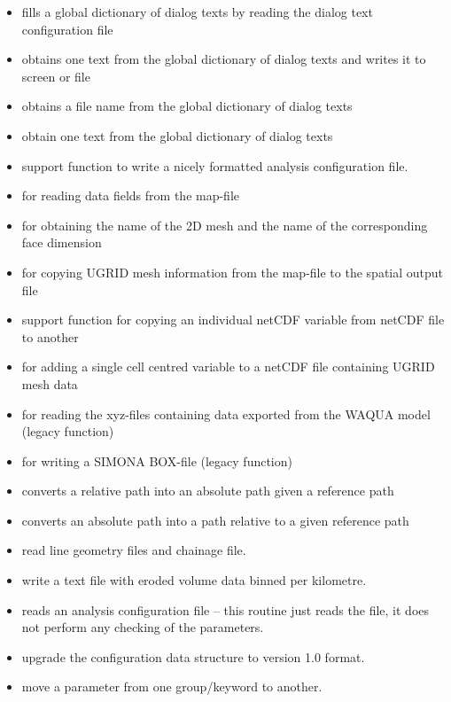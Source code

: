 \begin{itemize}
\item {} fills a global dictionary of dialog texts by reading the dialog text configuration file
\item {} obtains one text from the global dictionary of dialog texts and writes it to screen or file
\item {} obtains a file name from the global dictionary of dialog texts
\item {} obtain one text from the global dictionary of dialog texts

\item {} support function to write a nicely formatted analysis configuration file.

\item {} for reading data fields from the \dflowfm map-file
\item {} for obtaining the name of the 2D mesh and the name of the corresponding face dimension
\item {} for copying UGRID mesh information from the \dflowfm map-file to the spatial output file
\item {} support function for copying an individual netCDF variable from netCDF file to another
\item {} for adding a single cell centred variable to a netCDF file containing UGRID mesh data

\item {} for reading the xyz-files containing data exported from the WAQUA model (legacy function)
\item {} for writing a SIMONA BOX-file (legacy function)

\item {} converts a relative path into an absolute path given a reference path
\item {} converts an absolute path into a path relative to a given reference path

\item {} read line geometry files and chainage file.
\item {} write a text file with eroded volume data binned per kilometre.

\item {} reads an analysis configuration file -- this routine just reads the file, it does not perform any checking of the parameters.
\item {} upgrade the configuration data structure to version 1.0 format.
\item {} move a parameter from one group/keyword to another.


\end{itemize}

